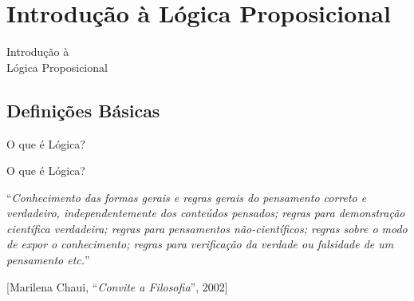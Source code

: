 
\section{Introdução à Lógica Proposicional} %

\begin{frame}[t]
\vskip 3cm
\begin{center}
{\Huge Introdução à\\Lógica Proposicional}
\end{center}
\end{frame}

\begin{frame}[t]
	\begin{figure}
	\end{figure}
\end{frame}

\subsection{Definições Básicas}

\begin{frame}[t]{O que é Lógica?} %
\end{frame}

\begin{frame}[t]{O que é Lógica?} %
\begin{center}
``{\it Conhecimento das formas gerais e regras gerais do pensamento correto e verdadeiro, independentemente dos conteúdos pensados; regras para demonstração científica verdadeira; regras para pensamentos não-científicos; regras sobre o modo de expor o conhecimento; regras para verificação da verdade ou falsidade de um pensamento etc.}''
\end{center}

\begin{flushright}
\footnotesize{[Marilena Chaui, ``{\it Convite a Filosofia}'', 2002]}
\end{flushright}
\end{frame}


